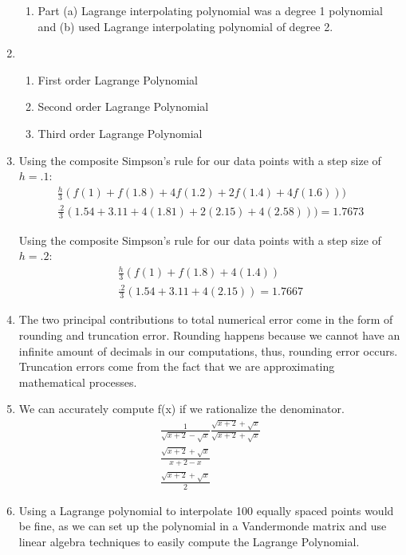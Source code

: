 \documentclass[12pt,letterpaper]{article}
\begin{document}
\begin{enumerate}
\begin{enumerate}
        \item
        Part (a) Lagrange interpolating polynomial was a degree 1 polynomial and (b) used Lagrange interpolating polynomial of degree 2. 
    \end{enumerate}

    \item
    \begin{enumerate}
        \item First order Lagrange Polynomial
        \item Second order Lagrange Polynomial
        \item Third order Lagrange Polynomial
    \end{enumerate}
    
    \item
    Using the composite Simpson's rule for our data points with a step size of $h = .1$: 
    \begin{gather}
        \frac{h}{3}(f(1) + f(1.8) + 4f(1.2)+2f(1.4)+4f(1.6)))\\
        \frac{.2}{3}(1.54+3.11+4(1.81)+2(2.15)+4(2.58))) = 1.7673
    \end{gather}
    
    Using the composite Simpson's rule for our data points with a step size of $h = .2$: 
    \begin{gather}
        \frac{h}{3}(f(1) + f(1.8) + 4(1.4))\\
        \frac{.2}{3}(1.54+3.11+4(2.15)) = 1.7667
    \end{gather}
    
    \item
    The two principal contributions to total numerical error come in the form of rounding and truncation error. Rounding happens because we cannot have an infinite amount of decimals in our computations, thus, rounding error occurs. Truncation errors come from the fact that we are approximating mathematical processes. 
    
    \item We can accurately compute f(x) if we rationalize the denominator.
    \begin{gather}
        \frac{1}{\sqrt{x+2} - \sqrt{x}} \frac{\sqrt{x+2}+\sqrt{x}}{\sqrt{x+2}+\sqrt{x}}\\
        \frac{\sqrt{x+2}+\sqrt{x}}{x+2-x}\\
        \frac{\sqrt{x+2}+\sqrt{x}}{2}
    \end{gather}
    
    \item
    Using a Lagrange polynomial to interpolate 100 equally spaced points would be fine, as we can set up the polynomial in a Vandermonde matrix and use linear algebra techniques to easily compute the Lagrange Polynomial.
    

\end{enumerate}
\end{document}
